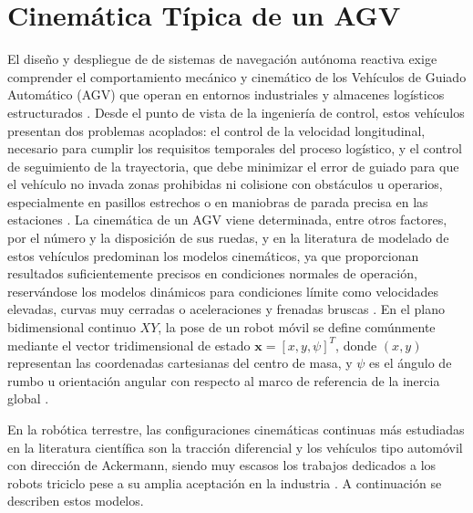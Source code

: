 \section{Cinemática Típica de un AGV}\label{sec:cinematica_agv}
El diseño y despliegue de de sistemas de navegación autónoma reactiva exige comprender el comportamiento mecánico y cinemático de los Vehículos de Guiado Automático (AGV) que operan en entornos industriales y almacenes logísticos estructurados \citep{ye2023toward}. Desde el punto de vista de la ingeniería de control, estos vehículos presentan dos problemas acoplados: el control de la velocidad longitudinal, necesario para cumplir los requisitos temporales del proceso logístico, y el control de seguimiento de la trayectoria, que debe minimizar el error de guiado para que el vehículo no invada zonas prohibidas ni colisione con obstáculos u operarios, especialmente en pasillos estrechos o en maniobras de parada precisa en las estaciones \citep{sierragarcia2024federated, sierragarcia2024combining}. La cinemática de un AGV viene determinada, entre otros factores, por el número y la disposición de sus ruedas, y en la literatura de modelado de estos vehículos predominan los modelos cinemáticos, ya que proporcionan resultados suficientemente precisos en condiciones normales de operación, reservándose los modelos dinámicos para condiciones límite como velocidades elevadas, curvas muy cerradas o aceleraciones y frenadas bruscas \citep{sanchez2022modelado}. En el plano bidimensional continuo $XY$, la pose de un robot móvil se define comúnmente mediante el vector tridimensional de estado $\mathbf{x} = [x, y, \psi]^T$, donde $(x, y)$ representan las coordenadas cartesianas del centro de masa, y $\psi$ es el ángulo de rumbo u orientación angular con respecto al marco de referencia de la inercia global \citep{sivashangaran2023deep}.

En la robótica terrestre, las configuraciones cinemáticas continuas más estudiadas en la literatura científica son la tracción diferencial y los vehículos tipo automóvil con dirección de Ackermann, siendo muy escasos los trabajos dedicados a los robots triciclo pese a su amplia aceptación en la industria \citep{sanchez2022modelado}. A continuación se describen estos modelos.

